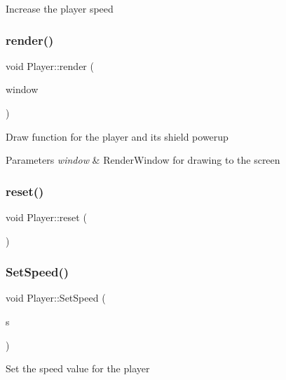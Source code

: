Increase the player speed 

\mbox{\label{class_player_a53938857e80374e79726309e78d1c15c}} 
\subsubsection{\texorpdfstring{render()}{render()}}
{\footnotesize\ttfamily void Player\+::render (\begin{DoxyParamCaption}\item[{sf\+::\+Render\+Window \&}]{window }\end{DoxyParamCaption})}



Draw function for the player and its shield powerup 


\begin{DoxyParams}{Parameters}
{\em window} & Render\+Window for drawing to the screen\\
\hline
\end{DoxyParams}
\mbox{\label{class_player_a1af5d39f7bac2aeaa1e30c7dda2332fa}} 
\subsubsection{\texorpdfstring{reset()}{reset()}}
{\footnotesize\ttfamily void Player\+::reset (\begin{DoxyParamCaption}{ }\end{DoxyParamCaption})}

\mbox{\label{class_player_ab7bcb2b3c60dd8a86577ee3c488bc50a}} 
\subsubsection{\texorpdfstring{SetSpeed()}{SetSpeed()}}
{\footnotesize\ttfamily void Player\+::\+Set\+Speed (\begin{DoxyParamCaption}\item[{float}]{s }\end{DoxyParamCaption})}



Set the speed value for the player 


